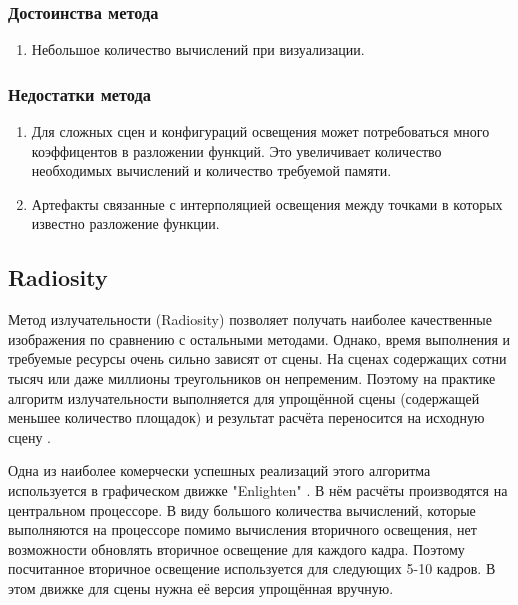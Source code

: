 \documentclass[12pt,fleqn]{article}
\begin{document}
\subsubsection{Достоинства метода}

\begin{enumerate}

\item Небольшое количество вычислений при визуализации.

\end{enumerate}

\subsubsection{Недостатки метода}

\begin{enumerate}

\item Для сложных сцен и конфигураций освещения может потребоваться много коэффицентов в разложении функций. Это увеличивает количество необходимых вычислений и количество требуемой памяти.

\item Артефакты связанные с интерполяцией освещения между точками в которых известно разложение функции.

\end{enumerate}

\subsection{Radiosity}

Метод излучательности (Radiosity) \cite{Radiosity, Radiosity2, Radiosity3, GPURadiosity} позволяет получать наиболее качественные изображения по сравнению с остальными методами. Однако, время выполнения и требуемые ресурсы очень сильно зависят от сцены. На сценах содержащих сотни тысяч или даже миллионы треугольников он непременим. Поэтому на практике алгоритм излучательности выполняется для упрощённой сцены (содержащей меньшее количество площадок) и результат расчёта переносится на исходную сцену \cite{Simplification}.

Одна из наиболее комерчески успешных реализаций этого алгоритма используется в графическом движке "Enlighten" \cite{Enlighten}. В нём расчёты производятся на центральном процессоре. В виду большого количества вычислений, которые выполняются на процессоре помимо вычисления вторичного освещения, нет возможности обновлять вторичное освещение для каждого кадра. Поэтому посчитанное вторичное освещение используется для следующих 5-10 кадров. В этом движке для сцены нужна её версия упрощённая вручную.
\end{document}
